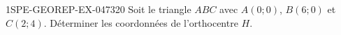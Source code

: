 \begin{exercice}{1SPE-GEOREP-EX-047}{3}{20}
Soit le triangle $ABC$ avec $A(0 ; 0)$, $B(6 ; 0)$ et $C(2 ; 4)$. Déterminer les coordonnées de l'orthocentre $H$.
\end{exercice}
